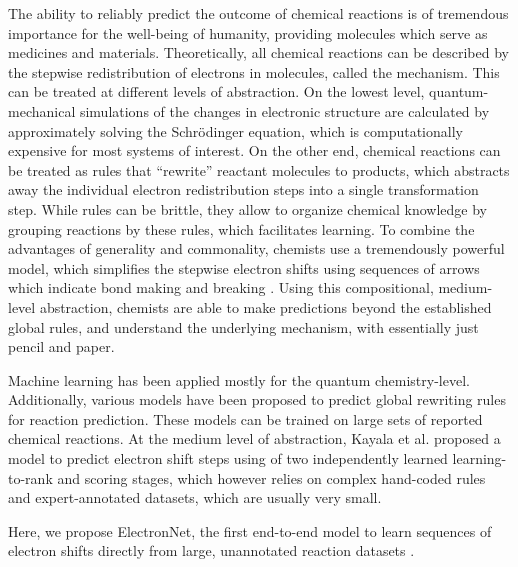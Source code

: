 
The ability to reliably predict the outcome of chemical reactions is of tremendous importance for the well-being of humanity, providing molecules which serve as medicines and materials. 
%
Theoretically, all chemical reactions can be described by the stepwise redistribution of electrons in molecules, called the mechanism. 
This can be treated at different levels of abstraction. On the lowest level, quantum-mechanical simulations of the  
changes in electronic structure are calculated by approximately solving the Schrödinger equation, which is computationally expensive for most systems of interest. 
On the other end, chemical reactions can be treated as rules that ``rewrite'' reactant molecules to products, which abstracts away the individual electron redistribution steps into a single transformation step. While rules can be brittle, they allow to organize chemical knowledge by grouping reactions by these rules, which facilitates learning.
To combine the advantages of generality and commonality, chemists use a tremendously powerful model, which simplifies the stepwise electron shifts using sequences of arrows which indicate bond making and breaking \cite{herges1994organizing}. 
Using this compositional, medium-level abstraction, chemists are able to make predictions beyond the established global rules, and understand the underlying mechanism, with essentially just pencil and paper.

Machine learning has been applied mostly for the quantum chemistry-level\cite{NIPS2012_4830,schutt2017schnet}. Additionally, various models have been proposed to predict global rewriting rules for reaction prediction\cite{coley2017prediction,jin2017predicting,neural-symbolic,schwaller2017found,wei2016neural,zhang2005structure}. These models can be trained on large sets of reported chemical reactions. 
At the medium level of abstraction, Kayala et al. proposed a model to predict electron shift steps using of two independently learned learning-to-rank and scoring stages,
 which however relies on complex hand-coded rules and expert-annotated datasets, which are usually very small.\cite{kayala2011learning,kayala2012reactionpredictor} 


Here, we propose ElectronNet, the first end-to-end model to learn sequences of electron shifts directly from large, unannotated reaction datasets .